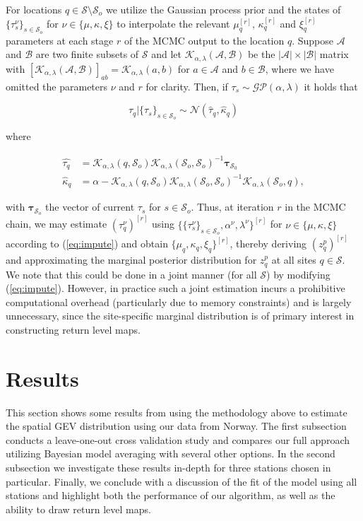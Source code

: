 \documentclass[11pt,english]{article}
\newcommand{\bs}[1]{\boldsymbol{#1}}
\newcommand{\mc}[1]{\mathcal{#1}}
\newcommand{\bl}{\begin{linenomath}}
\newcommand{\el}{\end{linenomath}}
\begin{document}
For locations $q\in\mc{S} \setminus \mc{S}_o$ we utilize the Gaussian process prior and the states of $\{\tau^\nu_{s}\}_{s\in\mc{S}_o}$ for $\nu \in \{ \mu, \kappa, \xi \}$ to interpolate  the relevant $\mu_q^{[r]}$, $\kappa_q^{[r]}$ and $\xi_q^{[r]}$ parameters at each stage $r$ of the MCMC output to the location $q$.  Suppose $\mc{A}$ and  $\mc{B}$ are two finite subsets of $\mc{S}$ and let $\mc{K}_{\alpha,\lambda}(\mc{A},\mc{B})$ be the $|\mc{A}|\times |\mc{B}|$ matrix with $[\mc{K}_{\alpha,\lambda}(\mc{A},\mc{B})]_{ab} = \mc{K}_{\alpha,\lambda}(a,b)$ for $a\in\mc{A}$ and  $b\in\mc{B}$, where we have omitted the parameters $\nu$ and $r$ for clarity.  Then, if $\tau_s \sim \mc{G}\mc{P}(\alpha,\lambda)$ it holds that
\bl\begin{equation}
\tau_q|\{\tau_{s}\}_{s\in\mc{S}_o} \sim \mc{N}(\hat{\tau}_q, \hat{\kappa}_q)\label{eq:impute}
\end{equation}\el
where 
\bl\begin{align*}
\hat{\tau_q} &= \mc{K}_{\alpha,\lambda}(q,\mc{S}_o)\mc{K}_{\alpha,\lambda}(\mc{S}_o,\mc{S}_o)^{-1}\bs{\tau}_{\mc{S}_0}\\
\hat{\kappa}_q &= \alpha - \mc{K}_{\alpha,\lambda}(q,\mc{S}_o)\mc{K}_{\alpha,\lambda}(\mc{S}_o,\mc{S}_o)^{-1}\mc{K}_{\alpha,\lambda}(\mc{S}_o,q),
\end{align*}\el
with $\bs{\tau}_{\mc{S}_o}$ the vector of current $\tau_s$ for $s\in\mc{S}_o$.  Thus, at iteration $r$ in the MCMC chain, we may estimate $(\tau_q^{\nu})^{[r]}$ using $\big\{\{\tau_s^{\nu}\}_{s\in\mc{S}_o}, \alpha^\nu, \lambda^{\nu}\big\}^{[r]}$ for $\nu \in \{ \mu, \kappa, \xi\}$ according to (\ref{eq:impute}) and obtain $\{ \mu_q, \kappa_q, \xi_q\}^{[r]}$, thereby deriving $(z^p_{q})^{[r]}$ and approximating the marginal posterior distribution for $z^p_q$ at all sites $q \in \mc{S}$. We note that this could be done in a joint manner (for all $\mc{S}$) by modifying (\ref{eq:impute}).  However, in practice such a joint estimation incurs a prohibitive computational overhead (particularly due to memory constraints) and is largely unnecessary, since the site-specific marginal distribution is of primary interest in constructing return level maps.
\section{Results}\label{sec:results}
This section shows some results from using the methodology above to estimate the spatial GEV distribution using our data from Norway.  The first subsection conducts a leave-one-out cross validation study and compares our full approach utilizing Bayesian model averaging with several other options.   In the second subsection we investigate these results in-depth for three stations chosen in particular.  Finally, we conclude with a discussion of the fit of the model using all stations and highlight both the performance of our algorithm, as well as the ability to draw return level maps.
\end{document}
